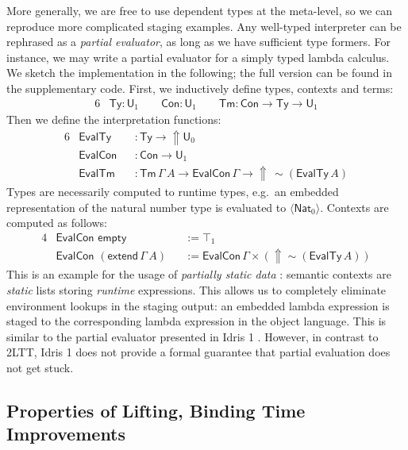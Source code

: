 \documentclass[acmsmall,review]{acmart}
\newcommand{\msf}[1]{\mathsf{#1}}
\newcommand{\Lift}{{\Uparrow}}
\newcommand{\spl}{{\sim}}
\newcommand{\qut}[1]{\langle #1\rangle}
\renewcommand{\U}{\msf{U}}
\newcommand{\Con}{\msf{Con}}
\newcommand{\Ty}{\msf{Ty}}
\newcommand{\Tm}{\msf{Tm}}
\newcommand{\Nat}{\msf{Nat}}
\theoremstyle{remark}
\begin{document}
More generally, we are free to use dependent types at the meta-level, so we can
reproduce more complicated staging examples. Any well-typed interpreter can be
rephrased as a \emph{partial evaluator}, as long as we have sufficient type
formers. For instance, we may write a partial evaluator for a simply typed
lambda calculus. We sketch the implementation in the following; the full version
can be found in the supplementary code. First, we inductively define types,
contexts and terms:
\begin{alignat*}{6}
  & \Ty : \U_1  \hspace{2em} \Con : \U_1 \hspace{2em} \Tm : \Con \to \Ty \to \U_1
\end{alignat*}
Then we define the interpretation functions:
\begin{alignat*}{6}
  & \msf{EvalTy}  &&: \Ty \to \Lift \U_0 \\
  & \msf{EvalCon} &&: \Con \to \U_1 \\
  & \msf{EvalTm}  &&: \Tm\,\Gamma\,A \to \msf{EvalCon}\,\Gamma \to \Lift\,\spl(\msf{EvalTy}\,A)
\end{alignat*}
Types are necessarily computed to runtime types, e.g.\ an embedded
representation of the natural number type is evaluated to $\qut{\Nat_0}$.
Contexts are computed as follows:
\begin{alignat*}{4}
  &\msf{EvalCon}\,\,\msf{empty}                &&:= \top_1 \\
  &\msf{EvalCon}\,\,(\msf{extend}\,\Gamma\,A) &&:= \msf{EvalCon}\,\Gamma \times (\Lift \spl(\msf{EvalTy}\,A))
\end{alignat*}
This is an example for the usage of \emph{partially static data} \cite{partial-evaluation}:
semantic contexts are \emph{static} lists storing \emph{runtime}
expressions. This allows us to completely eliminate environment lookups in the
staging output: an embedded lambda expression is staged to the corresponding
lambda expression in the object language. This is similar to the partial
evaluator presented in Idris 1 \cite{scrap-your-inefficient-engine}. However, in
contrast to 2LTT, Idris 1 does not provide a formal guarantee that partial
evaluation does not get stuck.

\subsection{Properties of Lifting, Binding Time Improvements}
\end{document}
